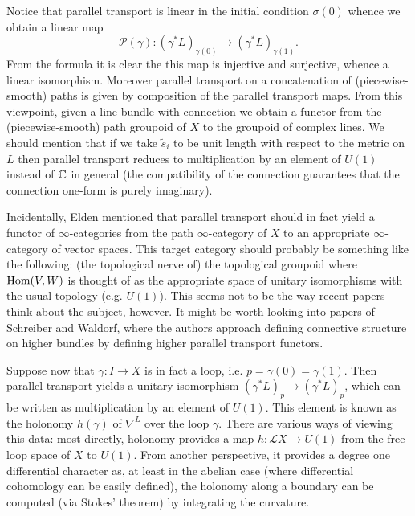 \documentclass{amsart}
\begin{document}
Notice that parallel transport is linear in the initial condition $\sigma(0)$
whence we obtain a linear map
\begin{equation*}
    \mathcal{P}(\gamma): (\gamma^*L)_{\gamma(0)} \to (\gamma^*L)_{\gamma(1)}.
\end{equation*}
From the formula it is clear the this map is injective and surjective, whence
a linear isomorphism. Moreover parallel transport on a concatenation of (piecewise-smooth)
paths is given by composition of the parallel transport maps. From this viewpoint,
given a line bundle with connection we obtain a functor from the (piecewise-smooth)
path groupoid of $X$ to the groupoid of complex lines.
We should mention that if we take $\tilde s_i$ to be unit length with respect
to the metric on $L$ then parallel transport reduces to multiplication by
an element of $U(1)$ instead of $\mathbb{C}$ in general (the compatibility of the connection
guarantees that the connection one-form is purely imaginary).

Incidentally, Elden mentioned that parallel transport should in fact yield
a functor of $\infty$-categories from the path $\infty$-category of $X$ to
an appropriate $\infty$-category of vector spaces. This target category should
probably be something like the following: (the topological nerve of) the
topological groupoid where $\operatorname{Hom}(V,W)$ is thought of as the appropriate space of
unitary isomorphisms with the usual topology (e.g. $U(1)$). This seems not
to be the way recent papers think about the subject, however. It might be
worth looking into papers of Schreiber and Waldorf, where the authors approach
defining connective structure on higher bundles by defining higher parallel
transport functors.

Suppose now that $\gamma:I\to X$ is in fact a loop, i.e. $p=\gamma(0)=\gamma(1)$.
Then parallel transport yields a unitary isomorphism $(\gamma^*L)_p\to(\gamma^*L)_p$,
which can be written as multiplication by an element of $U(1)$. This element is
known as the holonomy $h(\gamma)$ of $\nabla^L$ over the loop $\gamma$. There are various ways
of viewing this data: most directly, holonomy provides a map $h:\mathcal{L}X\to U(1)$
from the free loop space of $X$ to $U(1)$.  From another perspective, it provides a degree one differential character
as, at least in the abelian case (where differential cohomology can be easily defined),
the holonomy along a boundary can be computed (via Stokes' theorem) by integrating
the curvature.
\end{document}
